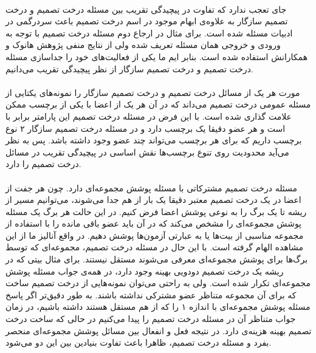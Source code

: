 \documentclass[a4paper]{article}
\begin{document}
	\paragraph{}
	جای تعجب ندارد که تفاوت در پیچیدگی تقریب بین مسئله درخت تصمیم و درخت تصمیم سازگار به علاوه‌ی ابهام موجود در اسم
	درخت تصمیم باعث سردرگمی در ادبیات مسئله شده است. برای مثال در ارجاع دوم مسئله درخت تصمیم با توجه به ورودی و
	خروجی همان مسئله تعریف شده ولی از نتایج منفی پژوهش هانوک و همکارانش استفاده شده است. بنابر ایم ما یکی از فعالیت‌های خود را جداسازی مسئله درخت تصمیم و درخت تصمیم سازگار از نظر پیچیدگی تقریب می‌دانیم.
	\paragraph{}
	مورت هر یک از مسائل درخت تصمیم و درخت تصمیم سازگار را نمونه‌های یکتایی از مسئله عمومی درخت تصمیم می‌داند که در آن هر یک از اعضا با یکی از 
	برچسب ممکن علامت گذاری شده است. با این فرض در مسئله درخت تصمیم این پارامتر 
	برابر با 
	است و هر عضو دقیقا یک برچسب دارد و در مسئله درخت تصمیم سازگار ۲ نوع برچسب داریم که برای هر برچسب می‌تواند چند عضو وجود داشته باشد. پس به نظر می‌آید محدودیت روی تنوع برچسب‌ها نقش اساسی در پیچیدگی تقریب در مسائل درخت تصمیم را دارد. 
	\paragraph{}
	مسئله درخت تصمیم مشترکاتی با مسئله پوشش مجموعه‌ای
	دارد. چون هر جفت از اعضا در یک درخت تصمیم معتبر دقیقا یک بار از هم جدا می‌شوند، می‌توانیم مسیر از ریشه تا یک برگ را به نوعی پوشش اعضا فرض کنیم. در این حالت هر برگ یک مسئله پوشش مجموعه‌ای را مشخص می‌کند که در آن باید 
	عضو باقی مانده را با استفاده از مجموعه مناسبی از بیت‌ها یا به عبارتی آزمون‌ها پوشش دهیم. در واقع آنالیز ما
	از این مشاهده الهام گرفته است. با این حال در مسئله درخت تصمیم،
	مجموعه‌ای که توسط برگ‌ها برای پوشش مجموعه‌ای معرفی می‌شوند مستقل نیستند. برای مثال بیتی که در ریشه یک درخت تصمیم
	دودویی بهینه وجود دارد، در همه‌ی
	جواب مسئله پوشش مجموعه‌ای تکرار شده است. ولی به راحتی می‌توان نمونه‌هایی از درخت تصمیم ساخت که برای آن 
	مجموعه متناظر عضو مشترکی نداشته باشند. به طور دقیق‌تر اگر پاسخ 
	مسئله پوشش مجموعه‌ای با اندازه ۱ را که از هم مستقل هستند داشته باشیم، در زمان 
	جواب متناظر آن در مسئله درخت تصمیم را پیدا می‌کنیم در حالی که ساخت درخت تصمیم بهینه هزینه‌ی
	دارد. در نتیجه فعل و انفعال بین مسائل پوشش مجموعه‌ای منحصر بفرد و مسئله درخت تصمیم، ظاهرا باعث تفاوت بنیادین بین این دو می‌شود.
\end{document}

